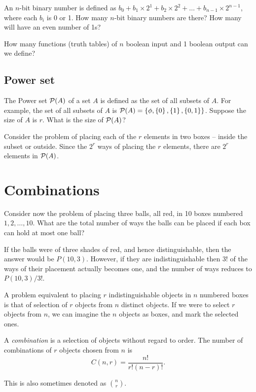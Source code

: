 \begin{exercise}
An $n$-bit binary number is defined as $b_0 + b_1 \times 2^1 + b_2 \times 2^2 + \ldots + b_{n-1} \times 2^{n-1}$, where each $b_i$ is 0 or 1. How many $n$-bit binary numbers are there? How many will have an even number of 1s?
\end{exercise}


\begin{exercise}
How many functions (truth tables) of $n$ boolean input and 1 boolean output can we define?
\end{exercise}

\subsection{Power set}
The Power set ${\cal P}(A)$ of a set $A$ is defined as the set of all subsets of $A$. For example, the set of all subsets of $A$ is ${\cal P}(A) = \left\{\phi, \left\{0\right\},  \left\{1\right\},  \left\{0,1\right\} \right\}$. Suppose the size of $A$ is
$r$. What is the size of ${\cal P}(A)$?

Consider the problem of placing each of the $r$ elements in two boxes -- inside the subset or outside. Since the $2^r$ ways of placing the $r$ elements, there are $2^r$ elements in ${\cal P}(A)$.


\section{Combinations} 

Consider now the problem of placing three balls, all red, in 10 boxes numbered $1,2,\ldots,10$. What are the total number of ways the balls can be placed if each box can hold at most one ball?

If the balls were of three shades of red, and hence distinguishable, then the answer would be $P(10,3)$. However, if  they are indistinguishable then $3!$ of the ways of their placement actually becomes one, and the number of ways reduces to $P(10,3)/3!$.

A problem equivalent to placing $r$ indistinguishable objects in $n$ numbered boxes is that of selection of $r$ objects from $n$ distinct objects. If we were to select $r$ objects from $n$, we can imagine the $n$ objects as boxes, and mark the selected ones. 

\begin{definition}
A \emph{combination} is a selection of objects without regard to order.
The number of combinations of $r$ objects chosen from $n$ is
\[
C(n,r) = \frac{n!}{r!(n-r)!}.
\]
\end{definition}
This is also sometimes denoted as $\binom{n}{r}$.


